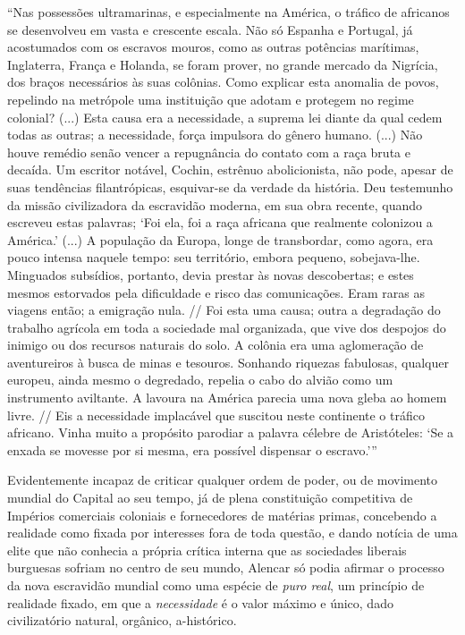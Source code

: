 ``Nas possessões ultramarinas, e especialmente na América, o tráfico de
africanos se desenvolveu em vasta e crescente escala. Não só Espanha e
Portugal, já acostumados com os escravos mouros, como as outras
potências marítimas, Inglaterra, França e Holanda, se foram prover, no
grande mercado da Nigrícia, dos braços necessários às suas colônias.
Como explicar esta anomalia de povos, repelindo na metrópole uma
instituição que adotam e protegem no regime colonial? (...) Esta causa
era a necessidade, a suprema lei diante da qual cedem todas as outras; a
necessidade, força impulsora do gênero humano. (...) Não houve remédio
senão vencer a repugnância do contato com a raça bruta e decaída. Um
escritor notável, Cochin, estrênuo abolicionista, não pode, apesar de
suas tendências filantrópicas, esquivar-se da verdade da história. Deu
testemunho da missão civilizadora da escravidão moderna, em sua obra
recente, quando escreveu estas palavras; `Foi ela, foi a raça africana
que realmente colonizou a América.' (...) A população da Europa, longe
de transbordar, como agora, era pouco intensa naquele tempo: seu
território, embora pequeno, sobejava-lhe. Minguados subsídios, portanto,
devia prestar às novas descobertas; e estes mesmos estorvados pela
dificuldade e risco das comunicações. Eram raras as viagens então; a
emigração nula. // Foi esta uma causa; outra a degradação do trabalho
agrícola em toda a sociedade mal organizada, que vive dos despojos do
inimigo ou dos recursos naturais do solo. A colônia era uma aglomeração
de aventureiros à busca de minas e tesouros. Sonhando riquezas
fabulosas, qualquer europeu, ainda mesmo o degredado, repelia o cabo do
alvião como um instrumento aviltante. A lavoura na América parecia uma
nova gleba ao homem livre. // Eis a necessidade implacável que suscitou
neste continente o tráfico africano. Vinha muito a propósito parodiar a
palavra célebre de Aristóteles: `Se a enxada se movesse por si mesma,
era possível dispensar o escravo.'''

Evidentemente incapaz de criticar qualquer ordem de poder, ou de
movimento mundial do Capital ao seu tempo, já de plena constituição
competitiva de Impérios comerciais coloniais e fornecedores de matérias
primas, concebendo a realidade como fixada por interesses fora de toda
questão, e dando notícia de uma elite que não conhecia a própria crítica
interna que as sociedades liberais burguesas sofriam no centro de seu
mundo, Alencar só podia afirmar o processo da nova escravidão mundial
como uma espécie de \emph{puro real}, um princípio de realidade fixado,
em que a \emph{necessidade} é o valor máximo e único, dado civilizatório
natural, orgânico, a-histórico.

